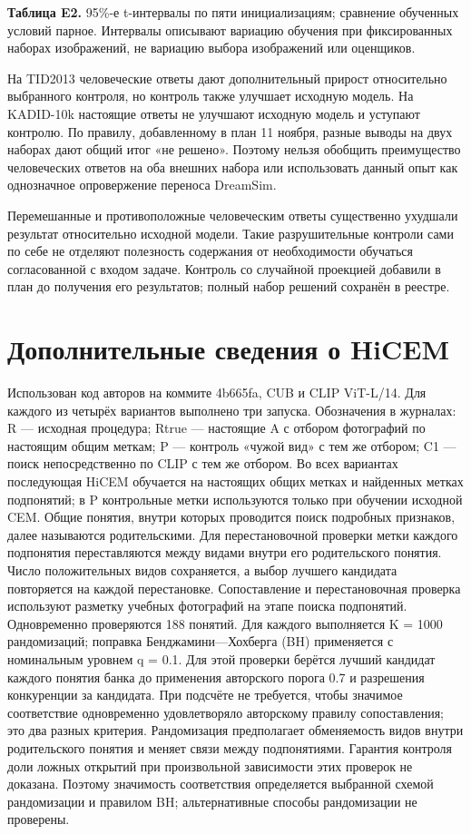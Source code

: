 \textbf{Таблица E2.} 95\%-е t-интервалы по пяти инициализациям; сравнение обученных условий парное. Интервалы описывают вариацию обучения при фиксированных наборах изображений, не вариацию выбора изображений или оценщиков.

На TID2013 человеческие ответы дают дополнительный прирост относительно выбранного контроля, но контроль также улучшает исходную модель. На KADID-10k настоящие ответы не улучшают исходную модель и уступают контролю. По правилу, добавленному в план 11 ноября, разные выводы на двух наборах дают общий итог «не решено». Поэтому нельзя обобщить преимущество человеческих ответов на оба внешних набора или использовать данный опыт как однозначное опровержение переноса DreamSim.

Перемешанные и противоположные человеческим ответы существенно ухудшали результат относительно исходной модели. Такие разрушительные контроли сами по себе не отделяют полезность содержания от необходимости обучаться согласованной с входом задаче. Контроль со случайной проекцией добавили в план до получения его результатов; полный набор решений сохранён в реестре.

\section{Дополнительные сведения о HiCEM}\label{app:hicem}

Использован код авторов на коммите 4b665fa, CUB и CLIP ViT-L/14. Для каждого из четырёх вариантов выполнено три запуска. Обозначения в журналах: R — исходная процедура; Rtrue — настоящие A с отбором фотографий по настоящим общим меткам; P — контроль «чужой вид» с тем же отбором; C1 — поиск непосредственно по CLIP с тем же отбором. Во всех вариантах последующая HiCEM обучается на настоящих общих метках и найденных метках подпонятий; в P контрольные метки используются только при обучении исходной CEM. Общие понятия, внутри которых проводится поиск подробных признаков, далее называются родительскими. Для перестановочной проверки метки каждого подпонятия переставляются между видами внутри его родительского понятия. Число положительных видов сохраняется, а выбор лучшего кандидата повторяется на каждой перестановке. Сопоставление и перестановочная проверка используют разметку учебных фотографий на этапе поиска подпонятий. Одновременно проверяются 188 понятий. Для каждого выполняется K = 1000 рандомизаций; поправка Бенджамини—Хохберга (BH) применяется с номинальным уровнем q = 0.1. Для этой проверки берётся лучший кандидат каждого понятия банка до применения авторского порога 0.7 и разрешения конкуренции за кандидата. При подсчёте не требуется, чтобы значимое соответствие одновременно удовлетворяло авторскому правилу сопоставления; это два разных критерия. Рандомизация предполагает обменяемость видов внутри родительского понятия и меняет связи между подпонятиями. Гарантия контроля доли ложных открытий при произвольной зависимости этих проверок не доказана. Поэтому значимость соответствия определяется выбранной схемой рандомизации и правилом BH; альтернативные способы рандомизации не проверены.

